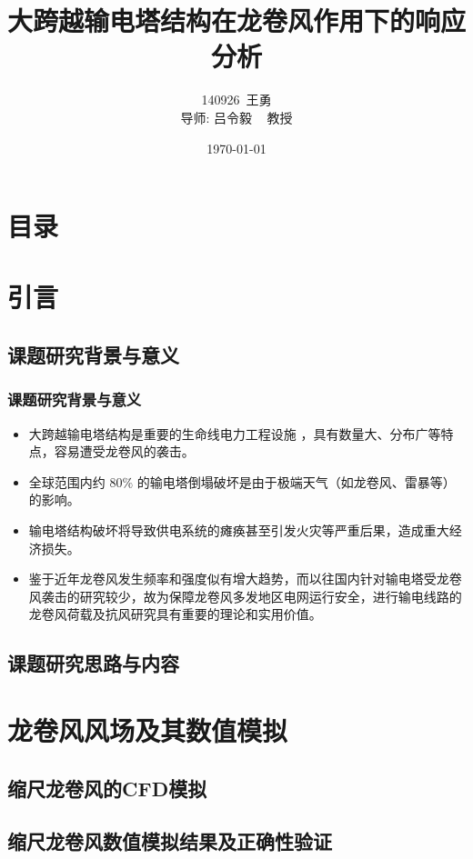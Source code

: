 \documentclass[]{beamer}
\title[硕士学位论文答辩]{大跨越输电塔结构在龙卷风作用下的响应分析}
\author{140926~王勇 \\[1.5 \baselineskip]  \footnotesize{导师: 吕令毅 ~ 教授}}
\institute{东南大学土木工程学院}
\date{\today}
\begin{document}
\begin{frame}
  \titlepage
\end{frame}

\section*{目录}
\begin{frame}
  \tableofcontents
\end{frame}

\section{引言}
\subsection{课题研究背景与意义}

\begin{frame}
  \frametitle{课题研究背景与意义}
  \begin{itemize}
  \item
    大跨越输电塔结构是重要的生命线电力工程设施 ，具有数量大、分布广等特点，容易遭受龙卷风的袭击。
  \item
    全球范围内约 $80\%$ 的输电塔倒塌破坏是由于极端天气（如龙卷风、雷暴等）的影响。
  \item
    输电塔结构破坏将导致供电系统的瘫痪甚至引发火灾等严重后果，造成重大经济损失。
    \bigskip
  \item
    鉴于近年龙卷风发生频率和强度似有增大趋势，而以往国内针对输电塔受龙卷风袭击的研究较少，故为保障龙卷风多发地区电网运行安全，进行输电线路的龙卷风荷载及抗风研究具有重要的理论和实用价值。
  
  \end{itemize}
 
\end{frame}
\subsection{课题研究思路与内容}

\section{龙卷风风场及其数值模拟}
\subsection{缩尺龙卷风的CFD模拟}
\subsection{缩尺龙卷风数值模拟结果及正确性验证}
\end{document}
